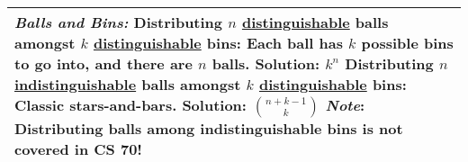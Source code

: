 {\begin{tabu}{|p{16cm} |}
\textit{Balls and Bins:} \newline
\textbf{Distributing $n$ \underline{distinguishable} balls amongst $k$ \underline{distinguishable} bins:} Each ball has $k$ possible bins to go into, and there are $n$ balls. Solution: $k^{n}$ \newline
\textbf{Distributing $n$ \underline{indistinguishable} balls amongst $k$ \underline{distinguishable} bins:} Classic stars-and-bars. Solution: ${n+k-1 \choose k}$ \newline
\textit{Note}: Distributing balls among indistinguishable bins is not covered in CS 70! 
\newline
\\
\hline
\end{tabu}
}


